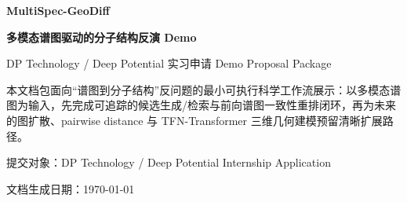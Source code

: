 \documentclass[11pt,a4paper,fontset=none]{ctexart}
\newcommand{\projectname}{MultiSpec-GeoDiff}
\begin{document}
\begin{titlepage}
  \centering
  \vspace*{2.8cm}
  {\Huge\bfseries\color{accentblue}\projectname\par}
  \vspace{0.4cm}
  {\LARGE\bfseries 多模态谱图驱动的分子结构反演 Demo\par}
  \vspace{1.0cm}
  {\large DP Technology / Deep Potential 实习申请 Demo Proposal Package\par}
  \vspace{1.8cm}
  \begin{keybox}[项目定位]
  本文档包面向“谱图到分子结构”反问题的最小可执行科学工作流展示：以多模态谱图为输入，先完成可追踪的候选生成/检索与前向谱图一致性重排闭环，再为未来的图扩散、pairwise distance 与 TFN-Transformer 三维几何建模预留清晰扩展路径。
  \end{keybox}
  \vfill
  {\large 提交对象：DP Technology / Deep Potential Internship Application\par}
  \vspace{0.4cm}
  {\large 文档生成日期：\today\par}
\end{titlepage}


\tableofcontents
\clearpage
{}












\clearpage


\end{document}
